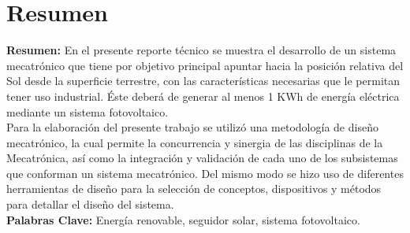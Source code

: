 \chapter{Resumen}


\textbf{Resumen:} En el presente reporte técnico se muestra el desarrollo de un sistema mecatrónico que tiene por objetivo principal apuntar hacia la posición relativa del Sol desde la superficie terrestre, con las características necesarias que le permitan tener uso industrial. Éste deberá de generar al menos 1 KWh de energía eléctrica mediante un sistema fotovoltaico.\\

Para la elaboración del presente trabajo se utilizó una metodología de diseño mecatrónico, la cual permite la concurrencia y sinergia de las disciplinas de la Mecatrónica, así como la integración y validación de cada uno de los subsistemas que conforman un sistema mecatrónico. Del mismo modo se hizo uso de diferentes herramientas de diseño para la selección de conceptos, dispositivos y métodos para detallar el diseño del sistema.\\


\textbf{Palabras Clave:} Energía renovable, seguidor solar, sistema fotovoltaico. \\



\endinput